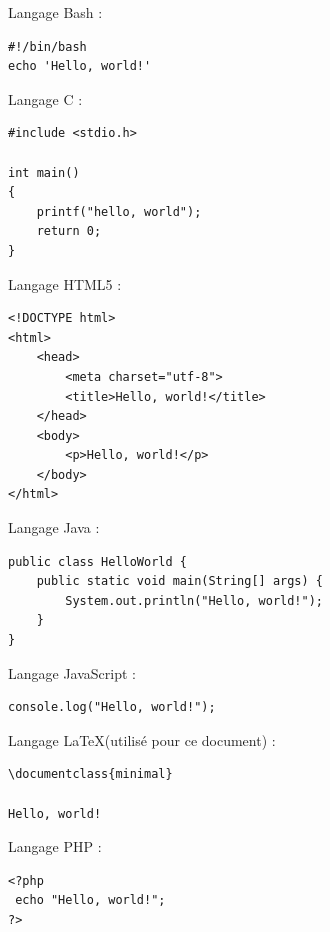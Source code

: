 \begin{multicols}{2}
Langage Bash :

\vspace{-2ex}
\begin{verbatim}
#!/bin/bash
echo 'Hello, world!'
\end{verbatim}

Langage C :

\vspace{-2ex}
\begin{verbatim}
#include <stdio.h>

int main()
{
    printf("hello, world");
    return 0;
}
\end{verbatim}

Langage HTML5 :

\vspace{-2ex}
\begin{verbatim}
<!DOCTYPE html>
<html>
    <head>
        <meta charset="utf-8">
        <title>Hello, world!</title>
    </head>
    <body>
        <p>Hello, world!</p>
    </body>
</html>
\end{verbatim}

Langage Java :

\vspace{-2ex}
\begin{verbatim}
public class HelloWorld {
    public static void main(String[] args) {
        System.out.println("Hello, world!"); 
    }
}
\end{verbatim}

Langage JavaScript :

\vspace{-2ex}
\begin{verbatim}
console.log("Hello, world!");
\end{verbatim}

Langage \LaTeX (utilisé pour ce document) :

\vspace{-2ex}
\begin{verbatim}
\documentclass{minimal}

Hello, world!

\end{verbatim}

Langage PHP :

\vspace{-2ex}
\begin{verbatim}
<?php
 echo "Hello, world!";
?>
\end{verbatim}
\end{multicols}

